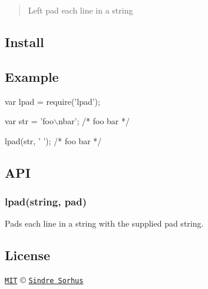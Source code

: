 \begin{quote}
Left pad each line in a string \end{quote}




\subsection*{Install}




\subsection*{Example}


\begin{DoxyCode}
var lpad = require('lpad');

var str = 'foo\(\backslash\)nbar';
/*
foo
bar
*/

lpad(str, '    ');
/*
    foo
    bar
*/
\end{DoxyCode}


\subsection*{A\+PI}

\subsubsection*{lpad(string, pad)}

Pads each line in a string with the supplied pad string.

\subsection*{License}

\href{http://opensource.org/licenses/MIT}{\tt M\+IT} © \href{http://sindresorhus.com}{\tt Sindre Sorhus} 
